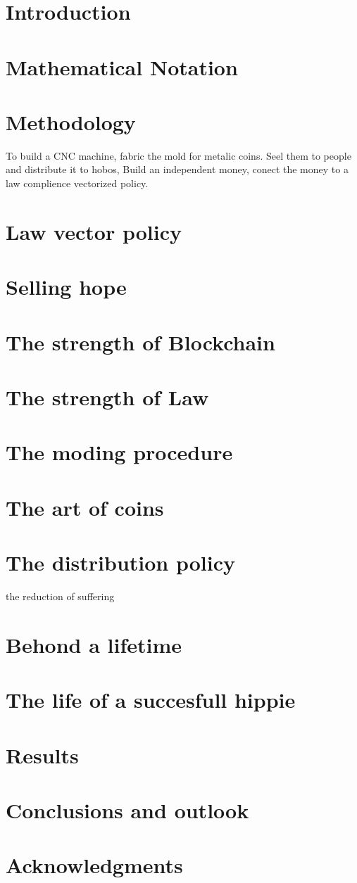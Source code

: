 \documentclass[a4paper,fleqn]{cas-sc}
\begin{document}
\section{Introduction}
\section{Mathematical Notation}
\section{Methodology}
To build a CNC machine, fabric the mold for metalic coins. 
Seel them to people and distribute it to hobos, 
Build an independent money, conect the money to a law complience vectorized policy. 
\noindent

\section{Law vector policy}
\section{Selling hope}
\section{The strength of Blockchain}
\section{The strength of Law}
\section{The moding procedure}
\section{The art of coins}
\section{The distribution policy}
the reduction of suffering
\section{Behond a lifetime}
\section{The life of a succesfull hippie}
\section{Results}

\section{Conclusions and outlook}

\section{Acknowledgments}



\end{document}
